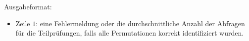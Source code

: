 \documentclass[12pt]{article}
\begin{document}
Ausgabeformat:
\begin{itemize}
    \item Zeile $1$: eine Fehlermeldung oder die durchschnittliche Anzahl der Abfragen für die Teilprüfungen, falls alle Permutationen korrekt identifiziert wurden.
\end{itemize}
\end{document}
